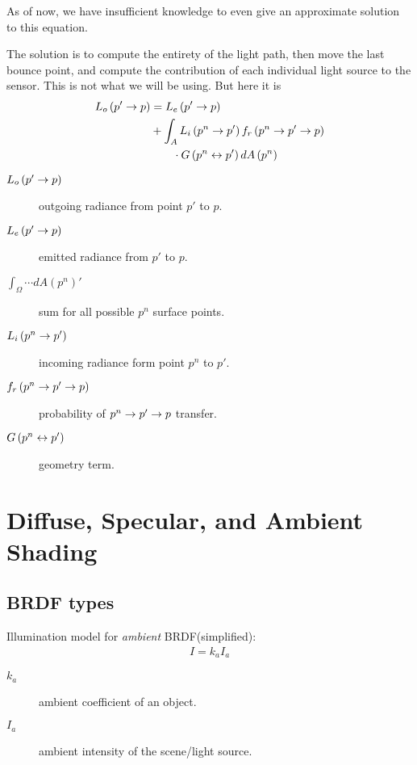\documentclass[../pbr.tex]{subfile}
\begin{document}
As of now, we have insufficient knowledge to even give an approximate solution
to this equation.

The solution is to compute the entirety of the light path, then move the last
bounce point, and compute the contribution of each individual light source to
the sensor. This is not what we will be using. But here it is
\begin{align*}
  L_o\left(p'\rightarrow p\right)&=L_e\left(p'\rightarrow p\right)\\&+\int_AL_i\left(p^n\rightarrow
    p'\right)f_r\left(p^n\rightarrow p'\rightarrow p\right)\\&\quad\quad\cdot G\left(p^n\leftrightarrow
    p'\right)dA\left(p^n\right)
\end{align*}
\begin{description}
  \item[$L_o\left(p'\rightarrow p\right)$] outgoing radiance from point $p'$ to $p$.
  \item[$L_e\left(p'\rightarrow p\right)$] emitted radiance from $p'$ to $p$.
  \item[$\int_\Omega\cdots dA\left(p^n\right)'$] sum for all possible $p^n$
    surface points.
  \item[$L_i\left(p^n\rightarrow p'\right)$] incoming radiance form point $p^n$ to
    $p'$.
  \item[$f_r\left(p^n\rightarrow p'\rightarrow p\right)$] probability of $p^n\rightarrow p'\rightarrow p$
    transfer.
  \item[$G\left(p^n\leftrightarrow p'\right)$] geometry term.
\end{description}

\section{Diffuse, Specular, and Ambient Shading}%
\label{sec:diffuse_specular_and_ambient_shading}

\subsection{BRDF types}%
\label{sub:brdf_types}

Illumination model for \textit{ambient} BRDF(simplified):
\begin{align*}
  I=k_aI_a
\end{align*}
\begin{description}
  \item[$k_a$] ambient coefficient of an object.
  \item[$I_a$] ambient intensity of the scene/light source.
\end{description}
\end{document}
